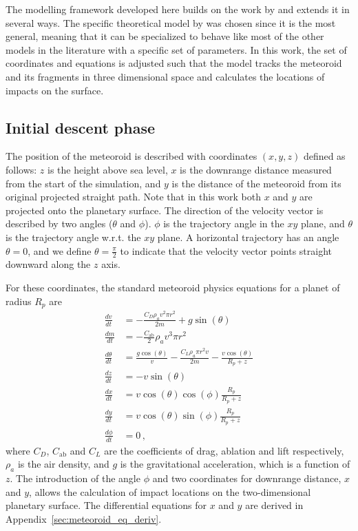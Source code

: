 \label{sec:forward_model}
The modelling framework developed here builds on the work by \cite{wheeler2017fragmentcloud,wheeler2018atmospheric} and extends it in several ways. The specific theoretical model by \cite{wheeler2017fragmentcloud} was chosen since it is the most general, meaning that it can be specialized to behave like most of the other models in the literature with a specific set of parameters.
In this work, the set of coordinates and equations is adjusted such that the model tracks the meteoroid and its fragments in three dimensional space and calculates the locations of impacts on the surface.

\subsection{Initial descent phase}

The position of the meteoroid is described with coordinates $(x, y, z)$ defined as follows: $z$ is the height above sea level, $x$ is the downrange distance measured from the start of the simulation, and $y$ is the distance of the meteoroid from its original projected straight path. Note that in this work both $x$ and $y$ are projected onto the planetary surface. The direction of the velocity vector is described by two angles ($\theta$ and $\phi$). $\phi$ is the trajectory angle in the $xy$ plane, and $\theta$ is the trajectory angle w.r.t. the $xy$ plane. A horizontal trajectory has an angle $\theta = 0$, and we define $\theta = \frac{\pi}{2}$ to indicate that the velocity vector points straight downward along the $z$ axis.

For these coordinates, the standard meteoroid physics equations \citep[e.g.][]{passey1980effects} for a planet of radius $R_p$ are
\begin{align}
    \label{eq:dvdt} \frac{dv}{dt} &= -\frac{C_D \rho_a v^2 \pi r^2}{2m} + g\sin(\theta) \\
    \frac{dm}{dt} &= -\frac{C_\mathrm{ab}}{2}\rho_a v^3 \pi r^2 \\
    \frac{d\theta}{dt} &= \frac{g\cos(\theta)}{v} - \frac{C_L \rho_a \pi r^2 v}{2m} - \frac{v\cos(\theta)}{R_p + z} \\
    \frac{dz}{dt} &= -v\sin(\theta) \\
    \frac{dx}{dt} &= v\cos(\theta)\cos(\phi)\frac{R_p}{R_p + z} \\
    \label{eq:dydt} \frac{dy}{dt} &= v\cos(\theta)\sin(\phi)\frac{R_p}{R_p + z} \\
    \frac{d\phi}{dt} &= 0\,,
\end{align}
where $C_D$, $C_\mathrm{ab}$ and $C_L$ are the coefficients of drag, ablation and lift respectively, $\rho_a$ is the air density, and $g$ is the gravitational acceleration, which is a function of $z$. The introduction of the angle $\phi$ and two coordinates for downrange distance, $x$ and $y$, allows the calculation of impact locations on the two-dimensional planetary surface. The differential equations for $x$ and $y$ are derived in Appendix~\ref{sec:meteoroid_eq_deriv}.

